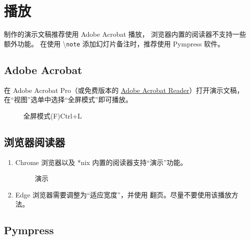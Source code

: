 \documentclass[
    UTF8,
    heading=true,
    12pt,
    a4paper
]{ctexrep}
\newcommand{\cmd}[1]{\textbackslash{}\texttt{#1}}
\begin{document}
\chapter{播放}

制作的演示文稿推荐使用 Adobe Acrobat 播放，
浏览器内置的阅读器不支持一些额外功能。
在使用 \cmd{note} 添加幻灯片备注时，推荐使用 Pympress 软件。

\section{Adobe Acrobat}

在 Adobe Acrobat Pro（或免费版本的
\href{https://www.adobe.com/cn/acrobat/pdf-reader
  .html}{Adobe Acrobat
  Reader}）打开演示文稿，在“视图”选单中选择“全屏模式”即可播放。

\begin{figure}[h]
  \centering
  \begin{tcolorbox}[enhanced, title={视图(V)},
    attach boxed title to top left, boxed title
    style={sharp corners}, sharp corners, tile,
    width=6cm]
    \faTv{} 全屏模式(F)\hfill Ctrl+L
  \end{tcolorbox}
\end{figure}

\section{浏览器阅读器}

\begin{enumerate}
  \item[\faChrome] Chrome 浏览器以及 *nix
        内置的阅读器支持“演示”功能。
        \begin{figure}[h]
          \centering
          \begin{tcolorbox}[enhanced,
              title={$\vdots$}, attach boxed
              title to top
              right, boxed title style={
                  circular arc, top=0mm,
                  bottom=2mm,
                  left=3.25mm, right=3.25mm
                },
              sharp corners, tile, width=6cm]
            演示
          \end{tcolorbox}
        \end{figure}
  \item[\faInternetExplorer] Edge
        浏览器需要调整为“适应宽度”\fbox{\faArrowsAltH}，并使用
         翻页。尽量不要使用该播放方法。
\end{enumerate}

\section{Pympress}
\end{document}
